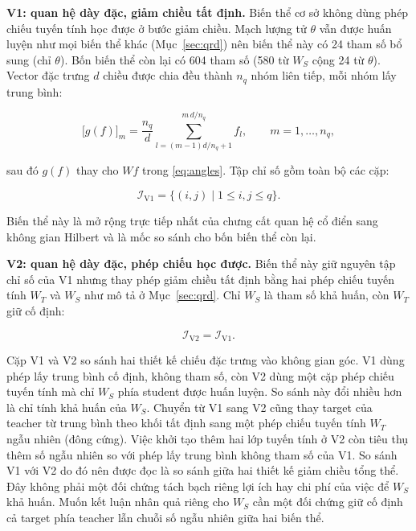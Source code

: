 \textbf{V1: quan hệ dày đặc, giảm chiều tất định.} Biến thể cơ sở không dùng
phép chiếu tuyến tính học được ở bước giảm chiều. Mạch lượng tử $\theta$ vẫn
được huấn luyện như mọi biến thể khác (Mục~\ref{sec:qrd}) nên biến thể này có 24 tham số bổ sung (chỉ $\theta$). Bốn biến thể còn lại có 604 tham số (580 từ $W_S$ cộng 24 từ $\theta$). Vector đặc trưng $d$ chiều
được chia đều thành $n_q$ nhóm liên tiếp, mỗi nhóm lấy trung bình:

\begin{equation}
\label{eq:chunk}
\big[g(f)\big]_m = \frac{n_q}{d}
  \sum_{l = (m-1)d/n_q + 1}^{m\,d/n_q} f_l,
  \qquad m = 1,\ldots,n_q,
\end{equation}

sau đó $g(f)$ thay cho $W f$ trong \eqref{eq:angles}. Tập chỉ số gồm toàn bộ
các cặp:

\begin{equation}
\label{eq:i-v1}
\mathcal{I}_{\mathrm{V1}} = \{(i,j) \mid 1 \le i,j \le q\}.
\end{equation}

Biến thể này là mở rộng
trực tiếp nhất của chưng cất quan hệ cổ điển sang không gian Hilbert và là
mốc so sánh cho bốn biến thể còn lại.

\textbf{V2: quan hệ dày đặc, phép chiếu học được.} Biến thể này giữ nguyên
tập chỉ số của V1 nhưng thay phép giảm chiều tất định bằng hai phép chiếu
tuyến tính $W_T$ và $W_S$ như mô tả ở Mục~\ref{sec:qrd}. Chỉ $W_S$ là tham số khả huấn, còn $W_T$ giữ cố định:

\begin{equation}
\label{eq:i-v2}
\mathcal{I}_{\mathrm{V2}} = \mathcal{I}_{\mathrm{V1}}.
\end{equation}

Cặp V1 và V2 so sánh hai thiết kế chiếu đặc trưng vào không gian góc. V1 dùng phép lấy trung bình cố định, không tham số, còn V2 dùng một cặp phép chiếu tuyến tính mà chỉ $W_S$ phía student được huấn luyện. So sánh
này đổi nhiều hơn là chỉ tính khả huấn của $W_S$. Chuyển từ V1 sang V2
cũng thay target của teacher từ trung bình theo khối tất định sang một
phép chiếu tuyến tính $W_T$ ngẫu nhiên (đông cứng). Việc khởi tạo thêm hai
lớp tuyến tính ở V2 còn tiêu thụ thêm số ngẫu nhiên so với phép lấy trung
bình không tham số của V1. So sánh V1 với V2 do đó nên được đọc là so sánh giữa hai thiết kế giảm chiều tổng thể. Đây không phải một đối chứng tách bạch riêng lợi ích hay chi phí của việc để $W_S$ khả huấn. Muốn kết luận nhân quả riêng
cho $W_S$ cần một đối chứng giữ cố định cả target phía teacher lẫn chuỗi số
ngẫu nhiên giữa hai biến thể.

